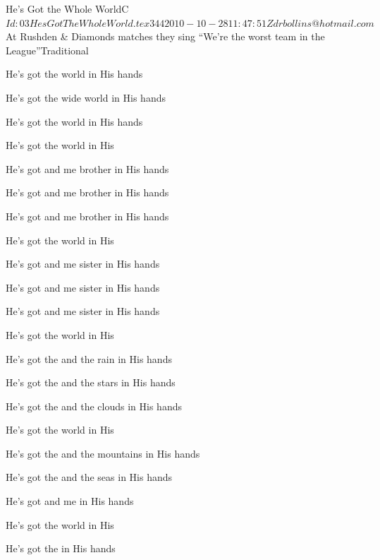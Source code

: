 \begin{SBSong}{He's Got the Whole World}{C}
    {$Id: 03HesGotTheWholeWorld.tex 344 2010-10-28 11:47:51Z drbollins@hotmail.com $}
    {At Rushden \& Diamonds matches they sing ``We're the worst team in the League''}{Traditional}
  \begin{SBVerse}
    He's got the  world in His hands
    
    He's got the  wide world in His hands

    He's got the  world in His hands

    He's got the  world in His 
  \end{SBVerse}
  \begin{SBVerse}
    He's got  and me brother in His hands

    He's got  and me brother in His hands

    He's got  and me brother in His hands

    He's got the  world in His 
  \end{SBVerse}
  \begin{SBVerse}
    He's got  and me sister in His hands

    He's got  and me sister in His hands

    He's got  and me sister in His hands

    He's got the  world in His 
  \end{SBVerse}
  \begin{SBVerse}
    He's got the  and the rain in His hands

    He's got the  and the stars in His hands

    He's got the  and the clouds in His hands

    He's got the  world in His 
  \end{SBVerse}
  \begin{SBVerse}
    He's got the  and the mountains in His hands

    He's got the  and the seas in His hands

    He's got  and me in His hands

    He's got the  world in His 
  \end{SBVerse}
  \begin{SBVerse}
    He's got the  in His hands


\end{SBVerse}
\end{SBSong}
